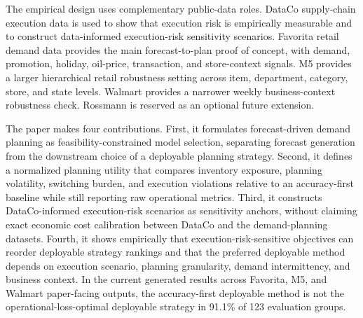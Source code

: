 The empirical design uses complementary public-data roles. DataCo supply-chain execution data is used to show that execution risk is empirically measurable and to construct data-informed execution-risk sensitivity scenarios. Favorita retail demand data provides the main forecast-to-plan proof of concept, with demand, promotion, holiday, oil-price, transaction, and store-context signals. M5 provides a larger hierarchical retail robustness setting across item, department, category, store, and state levels. Walmart provides a narrower weekly business-context robustness check. Rossmann is reserved as an optional future extension.

The paper makes four contributions. First, it formulates forecast-driven demand planning as feasibility-constrained model selection, separating forecast generation from the downstream choice of a deployable planning strategy. Second, it defines a normalized planning utility that compares inventory exposure, planning volatility, switching burden, and execution violations relative to an accuracy-first baseline while still reporting raw operational metrics. Third, it constructs DataCo-informed execution-risk scenarios as sensitivity anchors, without claiming exact economic cost calibration between DataCo and the demand-planning datasets. Fourth, it shows empirically that execution-risk-sensitive objectives can reorder deployable strategy rankings and that the preferred deployable method depends on execution scenario, planning granularity, demand intermittency, and business context. In the current generated results across Favorita, M5, and Walmart paper-facing outputs, the accuracy-first deployable method is not the operational-loss-optimal deployable strategy in 91.1\% of 123 evaluation groups.
